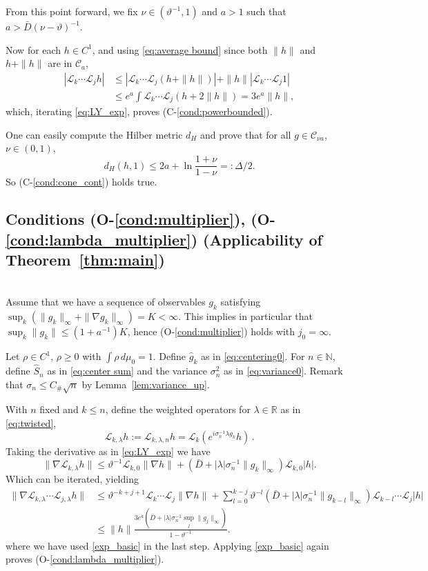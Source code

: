 \documentclass{amsart}
\numberwithin{equation}{section}
\newcommand\cC{{\mathcal C}}
\newcommand\cL{{\mathcal L}}
\newcommand{\Const}{C_{\#}}
\begin{document}
From this point forward, we fix $\nu \in (\vartheta^{-1}, 1)$ and $a>1$ such that $a > \bar D(\nu - \vartheta)^{-1}$.

Now for each $h\in C^1$, and using \eqref{eq:average bound} since both
$\| h\|$ and $h + \| h \|$ are in $\cC_a$, 
\begin{equation}\label{exp_basic}
\begin{split}
| \cL_{k}\cdots \cL_j h|&\leq |\cL_{k}\cdots \cL_j (h+\|h\|)|+\|h\||\cL_{k}\cdots \cL_j 1|\\
&\leq e^a\int \cL_{k}\cdots \cL_j (h+2\|h\|)=  3e^a\|h\|,
\end{split}
\end{equation}
 which, iterating \eqref{eq:LY_exp}, proves (C-\ref{cond:powerbounded}).

One can easily compute the Hilber metric $d_H$ and prove that for all $g\in\cC_{\nu a}$, $\nu\in (0,1)$,
\begin{equation}\label{eq:Delta_exp}
d_H(h,1)\leq 2 a+\ln\frac{1+\nu}{1-\nu}=:\Delta/2.
\end{equation}
So (C-\ref{cond:cone_cont}) holds true.

\subsection{Conditions (O-\ref{cond:multiplier}), (O-\ref{cond:lambda_multiplier}) (Applicability of Theorem~\ref{thm:main})}\ \\
Assume that we have a sequence of observables $g_k$ satisfying $\sup_k (\| g_k \|_\infty + \| \nabla g_k \|_\infty) = K < \infty$.  This implies in particular that $\sup_k \| g_k \| \le (1+a^{-1}) K$,  hence (O-\ref{cond:multiplier}) holds with $j_0 = \infty$.

Let $\rho \in C^1$, $\rho \ge 0$ with $\int \rho \, d\mu_0=1$. 
Define $\hat g_k$ as in \eqref{eq:centering0}. For $n \in \mathbb{N}$,
define $\hat S_n$ as in
\eqref{eq:center sum}  and the variance $\sigma_n^2$ as in \eqref{eq:variance0}. 
Remark that $\sigma_n \le \Const \sqrt{n}$ by Lemma~\ref{lem:variance_up}.

With $n$ fixed and $k \le n$, define the weighted operators for $\lambda \in \mathbb{R}$ as in
\eqref{eq:twisted},
\[
\cL_{k,\lambda} h := \cL_{k, \lambda, n} h = \cL_k ( e^{i \sigma_n^{-1} \lambda g_k} h) \, .
\]
Taking the derivative as in \eqref{eq:LY_exp} we have 
\[
\|\nabla \cL_{k,\lambda}h\|\leq \vartheta^{-1}\cL_{k,0} \|\nabla h\|+(\bar D+|\lambda| \sigma_n^{-1} \| g_{k}\|_\infty) \cL_{k,0}|h|.
\]
Which can be iterated, yielding
\[
\begin{split}
\|\nabla \cL_{k,\lambda}\cdots \cL_{ j, \lambda} h\|
&\leq \vartheta^{-k+j+1}\cL_{k}\cdots \cL_j \|\nabla h\|+\sum_{l=0}^{k-j}\vartheta^{-l}(\bar D+|\lambda|  \sigma_n^{-1} \|g_{k-l}\|_\infty )  \cL_{k-l}\cdots \cL_j |h|\\
&\leq \|h \| \frac{3 e^a(\bar D+|\lambda|  \sigma_n^{-1}  \sup_j\|g_{j}\|_\infty )}{1-\vartheta^{-1}}.
\end{split}
\]
where we have used \eqref{exp_basic} in the last step. Applying \eqref{exp_basic} again
proves (O-\ref{cond:lambda_multiplier}).
\end{document}
